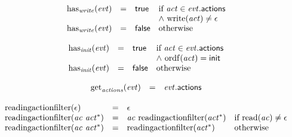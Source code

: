 \vspace{1ex}

$$
\begin{array}[t]{@{}lcl@{}l@{}}
{\mathrm{has}}_{\mathit{write}}({\mathit{evt}}) & = & \mathsf{true} & \quad
\begin{array}[t]{@{}l@{}}
\mbox{if}~ {\mathit{act}} \in {\mathit{evt}}{.}\mathsf{actions} \\
{\land}~ {\mathrm{write}}({\mathit{act}}) \neq \epsilon \\
\end{array} \\
{\mathrm{has}}_{\mathit{write}}({\mathit{evt}}) & = & \mathsf{false} & \quad \mbox{otherwise} \\
\end{array}
$$

$$
\begin{array}[t]{@{}lcl@{}l@{}}
{\mathrm{has}}_{\mathit{init}}({\mathit{evt}}) & = & \mathsf{true} & \quad
\begin{array}[t]{@{}l@{}}
\mbox{if}~ {\mathit{act}} \in {\mathit{evt}}{.}\mathsf{actions} \\
{\land}~ {\mathrm{ordf}}({\mathit{act}}) = \mathsf{init} \\
\end{array} \\
{\mathrm{has}}_{\mathit{init}}({\mathit{evt}}) & = & \mathsf{false} & \quad \mbox{otherwise} \\
\end{array}
$$

$$
\begin{array}[t]{@{}lcl@{}l@{}}
{\mathrm{get}}_{\mathit{actions}}({\mathit{evt}}) & = & {\mathit{evt}}{.}\mathsf{actions} \\
\end{array}
$$

$$
\begin{array}[t]{@{}lcl@{}l@{}}
{\mathrm{readingactionfilter}}(\epsilon) & = & \epsilon \\
{\mathrm{readingactionfilter}}({\mathit{ac}}~{{\mathit{act}}^\ast}) & = & {\mathit{ac}}~{\mathrm{readingactionfilter}}({{\mathit{act}}^\ast}) & \quad \mbox{if}~ {\mathrm{read}}({\mathit{ac}}) \neq \epsilon \\
{\mathrm{readingactionfilter}}({\mathit{ac}}~{{\mathit{act}}^\ast}) & = & {\mathrm{readingactionfilter}}({{\mathit{act}}^\ast}) & \quad \mbox{otherwise} \\
\end{array}
$$

